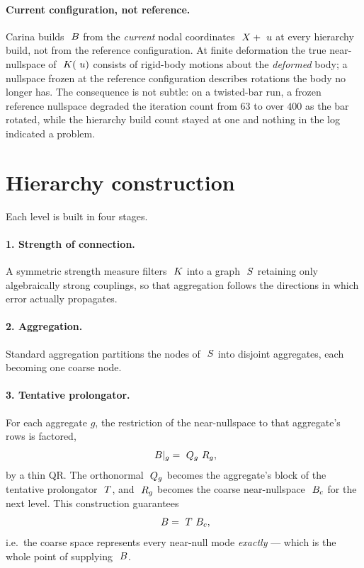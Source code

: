\paragraph{Current configuration, not reference.}  Carina builds $~B$ from
the \emph{current} nodal coordinates $~X + ~u$ at every hierarchy
build, not from the reference configuration.  At finite deformation the true
near-nullspace of $~K(~u)$ consists of rigid-body motions about the
\emph{deformed} body; a nullspace frozen at the reference configuration
describes rotations the body no longer has.  The consequence is not subtle:
on a twisted-bar run, a frozen reference nullspace degraded the iteration count
from $63$ to over $400$ as the bar rotated, while the hierarchy build count
stayed at one and nothing in the log indicated a problem.

\section{Hierarchy construction}

Each level is built in four stages.

\paragraph{1. Strength of connection.}  A symmetric strength measure filters
$~K$ into a graph $~S$ retaining only algebraically strong
couplings, so that aggregation follows the directions in which error actually
propagates.

\paragraph{2. Aggregation.}  Standard aggregation partitions the nodes of
$~S$ into disjoint aggregates, each becoming one coarse node.

\paragraph{3. Tentative prolongator.}  For each aggregate $g$, the restriction
of the near-nullspace to that aggregate's rows is factored,
\begin{equation}
  ~B|_g = ~Q_g ~R_g,
\end{equation}
by a thin QR.  The orthonormal $~Q_g$ becomes the aggregate's block of
the tentative prolongator $~T$, and $~R_g$ becomes the coarse
near-nullspace $~B_c$ for the next level.  This construction guarantees
\begin{equation}
  ~B = ~T~B_c ,
\end{equation}
i.e.\ the coarse space represents every near-null mode \emph{exactly} --- which
is the whole point of supplying $~B$.

